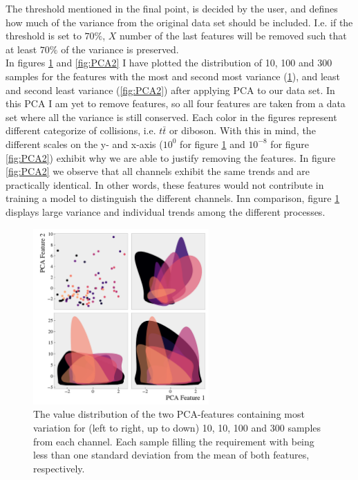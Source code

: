 The threshold mentioned in the final point, is decided by the user, and defines how much of the variance from the original data 
set should be included. I.e. if the threshold is set to $70\%$, $X$ number of the last features will be removed such 
that at least $70\%$ of the variance is preserved.
\\
In figures \ref{fig:PCA1} and \ref{fig:PCA2} I have plotted the distribution of 10, 100 and 300 samples 
for the features with the most and second most variance (\ref{fig:PCA1}), and least and second least 
variance (\ref{fig:PCA2}) after applying \ac{PCA} to our data set. In this \ac{PCA} I am yet to remove features, 
so all four features are taken from a data set where all the variance is still conserved. Each color in the figures 
represent different categorize of collisions, i.e. $t\bar{t}$ or diboson. With this in 
mind, the different scales on the y- and x-axis ($10^0$ for figure \ref{fig:PCA1} and $10^{-8}$ for figure 
\ref{fig:PCA2}) exhibit why we are able to justify removing the features. In figure \ref{fig:PCA2} we observe 
that all channels exhibit the same trends and are practically identical. In other words, these features 
would not contribute in training a model to distinguish the different channels. Inn comparison, figure 
\ref{fig:PCA1} displays large variance and individual trends among the different processes.
\begin{figure}
    \centering
    \includegraphics[width=0.6\textwidth]{Figures/MLResults/DataHandling/PCA/PCAPlotFirst.pdf}
    \caption[The value distribution of the two leading \acs{PCA}-features.]{The value distribution of 
    the two \ac{PCA}-features containing most variation for (left to right, up to down) 10, 10, 100 and 
    300 samples from each channel. Each sample filling the requirement with being less than one standard 
    deviation from the mean of both features, respectively.}
    \label{fig:PCA1}
\end{figure}
